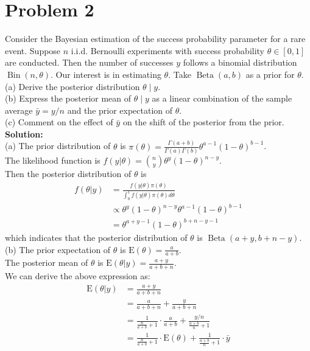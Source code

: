 \documentclass[UTF8]{ctexart}
\begin{document}
\section*{Problem 2}
\noindent
Consider the Bayesian estimation of the success probability parameter for a rare event. 
Suppose $n$ i.i.d. Bernoulli experiments with success probability $\theta \in[0,1]$ are conducted. 
Then the number of successes $y$ follows a binomial distribution $\operatorname{Bin}(n, \theta)$. 
Our interest is in estimating $\theta$. Take $\operatorname{Beta}(a, b)$ as a prior for $\theta$.\\
(a) Derive the posterior distribution $\theta \mid y$.\\
(b) Express the posterior mean of $\theta \mid y$ as a linear combination of the sample average $\bar{y}=y / n$ and the prior expectation of $\theta$.\\
(c) Comment on the effect of $\bar{y}$ on the shift of the posterior from the prior.\\
\textbf{\large Solution:}\\
(a) The prior distribution of $\theta$ is $\pi(\theta)=\frac{\Gamma(a+b)}{\Gamma(a) \Gamma(b)} \theta^{a-1}(1-\theta)^{b-1}$.\\
The likelihood function is $f(y|\theta)=\binom{n}{y}\theta^y(1-\theta)^{n-y}$.\\
Then the posterior distribution of $\theta$ is
\begin{equation*}
    \begin{aligned}
        f(\theta|y)&=\frac{f(y|\theta)\pi(\theta)}{\int_{0}^{1}f(y|\theta)\pi(\theta)d\theta}\\
        & \propto \theta^y(1-\theta)^{n-y}\theta^{a-1}(1-\theta)^{b-1}\\
        & = \theta^{a+y-1}(1-\theta)^{b+n-y-1}
    \end{aligned}
\end{equation*}
which indicates that the posterior distribution of $\theta$ is $\operatorname{Beta}(a+y, b+n-y)$.\\
(b) The prior expectation of $\theta$ is $\text{E} (\theta)=\frac{a}{a+b}$.\\
The posterior mean of $\theta$ is $\text{E} (\theta|y)=\frac{a+y}{a+b+n}$.\\
We can derive the above expression as:
\begin{equation*}
    \begin{aligned}
        \text{E} (\theta|y)&= \frac{a+y}{a+b+n}\\
        &= \frac{a}{a+b+n} + \frac{y}{a+b+n}\\
        &= \frac{1}{\frac{n}{a+b}+1} \cdot \frac{a}{a+b} + \frac{y/n}{\frac{a+b}{n}+1}\\
        &= \frac{1}{\frac{n}{a+b}+1} \cdot \text{E} (\theta) + \frac{1}{\frac{a+b}{n}+1} \cdot \bar{y}\\
    \end{aligned}
\end{equation*}
\end{document}
